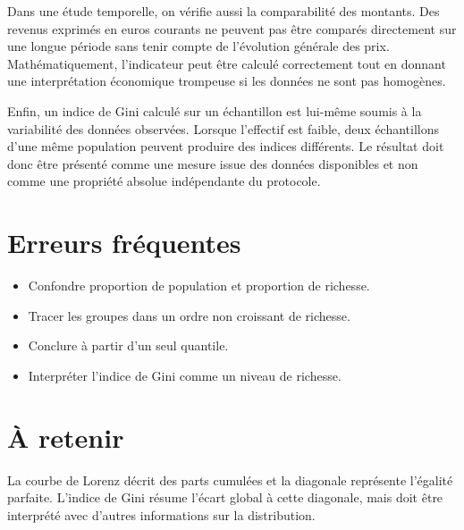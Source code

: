 Dans une étude temporelle, on vérifie aussi la comparabilité des montants. Des revenus exprimés en euros courants ne peuvent pas être comparés directement sur une longue période sans tenir compte de l'évolution générale des prix. Mathématiquement, l'indicateur peut être calculé correctement tout en donnant une interprétation économique trompeuse si les données ne sont pas homogènes.

Enfin, un indice de Gini calculé sur un échantillon est lui-même soumis à la variabilité des données observées. Lorsque l'effectif est faible, deux échantillons d'une même population peuvent produire des indices différents. Le résultat doit donc être présenté comme une mesure issue des données disponibles et non comme une propriété absolue indépendante du protocole.

\section{Erreurs fréquentes}
\begin{itemize}
\item Confondre proportion de population et proportion de richesse.
\item Tracer les groupes dans un ordre non croissant de richesse.
\item Conclure à partir d'un seul quantile.
\item Interpréter l'indice de Gini comme un niveau de richesse.
\end{itemize}
\section{À retenir}
\begin{aretenir}
La courbe de Lorenz décrit des parts cumulées et la diagonale représente l'égalité parfaite. L'indice de Gini résume l'écart global à cette diagonale, mais doit être interprété avec d'autres informations sur la distribution.
\end{aretenir}
